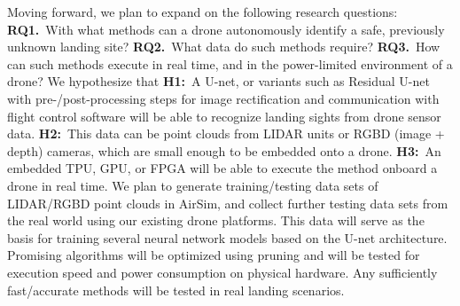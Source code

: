 Moving forward, we plan to expand on the following research questions:
\textbf{RQ1.}~With what methods can a drone autonomously identify a safe, previously unknown landing site?
\textbf{RQ2.}~What data do such methods require?
\textbf{RQ3.}~How can such methods execute in real time, and in the power-limited environment of a drone?
We hypothesize that
\textbf{H1:}~A U-net, or variants such as Residual U-net with pre-/post-processing steps for image rectification and communication with flight control software will be able to recognize landing sights from drone sensor data.
\textbf{H2:}~This data can be point clouds from LIDAR units or RGBD (image + depth) cameras, which are small enough to be embedded onto a drone.
\textbf{H3:}~An embedded TPU, GPU, or FPGA will be able to execute the method onboard a drone in real time.
We plan to generate training/testing data sets of LIDAR/RGBD point clouds in AirSim,
and collect further testing data sets from the real world using our existing drone platforms.
This data will serve as the basis for training several neural network models based on the U-net architecture.
Promising algorithms will be optimized using pruning and will be tested for execution speed and power consumption on physical hardware.
Any sufficiently fast/accurate methods will be tested in real landing scenarios.

\newpage